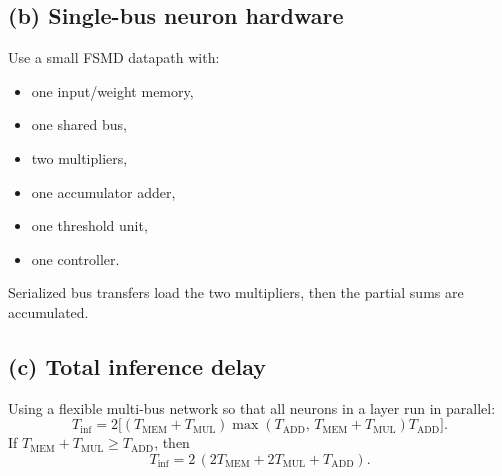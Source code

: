 \documentclass[11pt,a4paper]{article}
\begin{document}
\subsection*{(b) Single-bus neuron hardware}
Use a small FSMD datapath with:
\begin{itemize}
  \item one input/weight memory,
  \item one shared bus,
  \item two multipliers,
  \item one accumulator adder,
  \item one threshold unit,
  \item one controller.
\end{itemize}
Serialized bus transfers load the two multipliers, then the partial sums are accumulated.

\subsection*{(c) Total inference delay}
Using a flexible multi-bus network so that all neurons in a layer run in parallel:
\[
\boxed{
T_{\text{inf}}
=
2\Big[
(T_{\text{MEM}}+T_{\text{MUL}})
\max(T_{\text{ADD}},\,T_{\text{MEM}}+T_{\text{MUL}})
T_{\text{ADD}}
\Big].
}
\]
If $T_{\text{MEM}}+T_{\text{MUL}}\ge T_{\text{ADD}}$, then
\[
\boxed{
T_{\text{inf}} = 2\,(2T_{\text{MEM}}+2T_{\text{MUL}}+T_{\text{ADD}}).
}
\]
\end{document}
